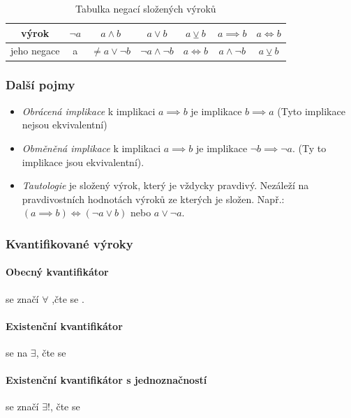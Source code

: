 \documentclass[12pt]{article}
\providecommand{\lxor}{\veebar}
\begin{document}
\begin{table}[h!]
\centering
\begin{tabular}{|c|c|c|c|c|c|c|}
\hline
výrok       & $\neg a$ & $a \land b$          & $a \lor b$            & $a \lxor b$ & $a \implies b$   & $a \iff b$  \\ \hline
jeho negace & a        & $\neq a \lor \neg b$ & $\neg a \land \neg b$ & $a \iff b$  & $a \land \neg b$ & $a \lxor b$ \\ \hline
\end{tabular}
\caption{Tabulka negací složených výroků}
\label{table:logika-negace}
\end{table}
\subsubsection{Další pojmy}
\label{sec:logika-dalsi_pojmy}
\begin{itemize}
\item \emph{Obrácená implikace} k implikaci $ a \implies b$ je implikace $b\implies a$ (Tyto implikace nejsou ekvivalentní)
\item \emph{Obměněná implikace} k implikaci $ a \implies b$ je implikace $\neg b \implies \neg a$. (Ty to implikace jsou ekvivalentní).
\item \emph{Tautologie} je složený výrok, který je vždycky pravdivý. Nezáleží na pravdivostních hodnotách výroků ze kterých je složen. Např.: \\ $( a \implies b) \iff ( \neg a \lor b)$ nebo $a \lor \neg a$.
\end{itemize}
\subsubsection{Kvantifikované výroky}
\paragraph{Obecný kvantifikátor} se značí $\forall$ ,čte se .
\paragraph{Existenční kvantifikátor} se na $\exists$, čte se 
\paragraph{Existenční kvantifikátor s jednoznačností} se značí $\exists!$, čte se 
\end{document}
